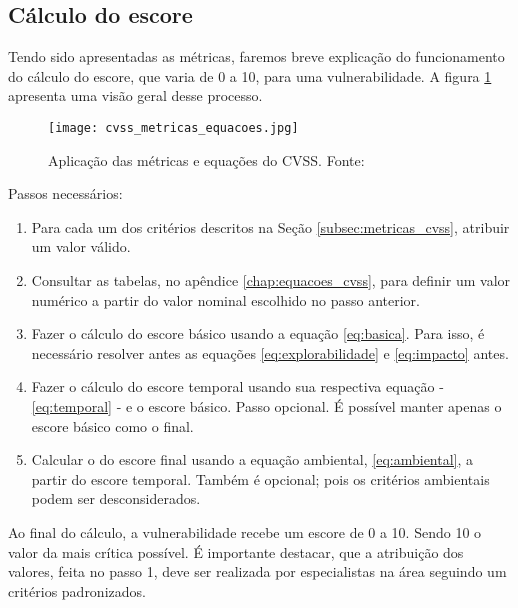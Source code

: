 		\subsection{Cálculo do escore}
			Tendo sido apresentadas as métricas, faremos breve explicação
			do funcionamento do cálculo do escore,
			que varia de 0 a 10, para uma vulnerabilidade.
			A figura \ref{fig:cvss_metricas_equacoes} apresenta uma visão geral desse processo. 
			\begin{figure}
				\begin{center}
					\texttt{[image: cvss\_metricas\_equacoes.jpg]}
					\caption{Aplicação das métricas e equações do CVSS. Fonte: \cite{Mell2007}}
					\label{fig:cvss_metricas_equacoes}
				\end{center}
			\end{figure}
			Passos necessários:
			\begin{enumerate}
				\item{Para cada um dos critérios descritos na Seção \ref{subsec:metricas_cvss},
					atribuir um valor válido.}
				\item{Consultar as tabelas, no apêndice	\ref{chap:equacoes_cvss},
					para definir um valor numérico a partir do valor nominal escolhido no passo anterior.}
				\item{Fazer o cálculo do escore básico usando a equação \ref{eq:basica}.
					Para isso, é necessário resolver antes as equações \ref{eq:explorabilidade} e
					\ref{eq:impacto} antes.}
				\item{Fazer o cálculo do escore temporal usando sua respectiva equação - \ref{eq:temporal} -
					 e o escore básico.	Passo opcional. É possível manter apenas o escore básico como o final.}
				\item{Calcular o do escore final usando a equação ambiental, \ref{eq:ambiental},
					 a partir do escore temporal. Também é opcional; pois os critérios 
					ambientais podem ser desconsiderados.}
			\end{enumerate}
			
			
			Ao final do cálculo, a vulnerabilidade recebe um escore de 0 a 10.
			Sendo 10 o valor da mais crítica possível. É importante destacar, que a atribuição
			dos valores, feita no passo 1, deve ser realizada por especialistas na área seguindo
			um critérios padronizados.

			
